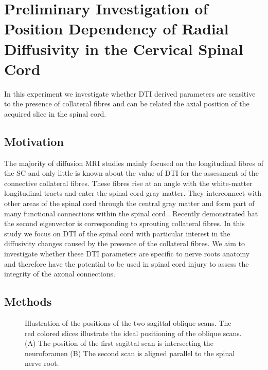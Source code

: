 \section{Preliminary Investigation of Position Dependency of Radial Diffusivity in the Cervical Spinal Cord} 
In this experiment we investigate whether DTI derived parameters are sensitive to the presence of collateral fibres and can be related the axial position of the acquired slice in the spinal cord. 
\subsection*{Motivation} The majority of diffusion MRI studies mainly focused on the longitudinal fibres of the SC and only little is known about the value of DTI for the assessment of the connective collateral fibres. These fibres rise at an angle with the white-matter longitudinal tracts and enter the spinal cord gray matter. They interconnect with other areas of the spinal cord through the central gray matter and form part of many functional connections within the spinal cord \citep{Carpenter:1991}. Recently \citet{Mamata:2006} demonstrated hat the second eigenvector is corresponding to sprouting collateral fibres. In this study we focus on DTI of the spinal cord with particular interest in the diffusivity changes caused by the presence of the collateral fibres. We aim to investigate whether these DTI parameters are specific to nerve roots anatomy and therefore have the potential to be used in spinal cord injury to assess the integrity of the axonal connections. 
\subsection*{Methods}
\begin{figure}
 \centering
  \caption{Illustration of the positions of the two sagittal oblique scans. The red colored slices illustrate the ideal positioning of the oblique scans. (A) The position of the first sagittal scan is intersecting the neuroforamen (B) The second scan is aligned parallel to the spinal nerve root.}
  \label{fig:slice_positioning}
\end{figure}
